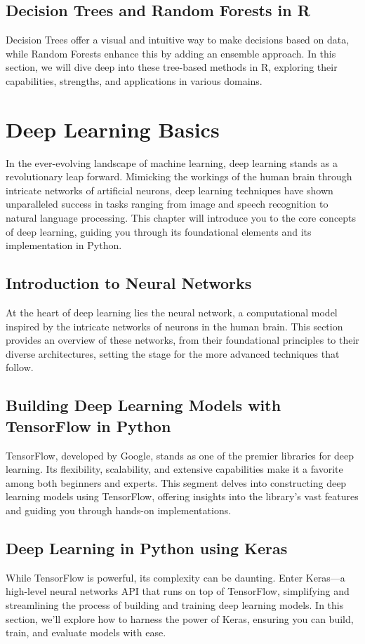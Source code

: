 \documentclass[a4paper,12pt]{book}
\begin{document}
\section{Decision Trees and Random Forests in R}
Decision Trees offer a visual and intuitive way to make decisions based on data, while Random Forests enhance this by adding an ensemble approach. In this section, we will dive deep into these tree-based methods in R, exploring their capabilities, strengths, and applications in various domains.

\chapter{Deep Learning Basics}
In the ever-evolving landscape of machine learning, deep learning stands as a revolutionary leap forward. Mimicking the workings of the human brain through intricate networks of artificial neurons, deep learning techniques have shown unparalleled success in tasks ranging from image and speech recognition to natural language processing. This chapter will introduce you to the core concepts of deep learning, guiding you through its foundational elements and its implementation in Python.

\section{Introduction to Neural Networks}
At the heart of deep learning lies the neural network, a computational model inspired by the intricate networks of neurons in the human brain. This section provides an overview of these networks, from their foundational principles to their diverse architectures, setting the stage for the more advanced techniques that follow.

\section{Building Deep Learning Models with TensorFlow in Python}
TensorFlow, developed by Google, stands as one of the premier libraries for deep learning. Its flexibility, scalability, and extensive capabilities make it a favorite among both beginners and experts. This segment delves into constructing deep learning models using TensorFlow, offering insights into the library's vast features and guiding you through hands-on implementations.

\section{Deep Learning in Python using Keras}
While TensorFlow is powerful, its complexity can be daunting. Enter Keras—a high-level neural networks API that runs on top of TensorFlow, simplifying and streamlining the process of building and training deep learning models. In this section, we'll explore how to harness the power of Keras, ensuring you can build, train, and evaluate models with ease.
\end{document}
